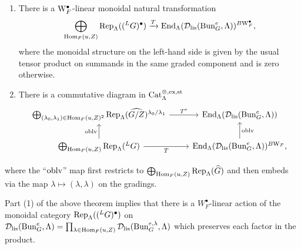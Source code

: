 \begin{thm}\label{thm:extended-hecke-action}
\begin{enumerate}
\item{There is a $\mathrm{W}_F^{\bullet}$-linear monoidal natural transformation 
\begin{equation*}
\bigoplus_{\mathrm{Hom}_{F}(u,Z)}\mathrm{Rep}_{\Lambda}(({^L}G)^{\bullet}) \xrightarrow{T} \mathrm{End}_{\Lambda}(\mathcal{D}_{\textnormal{lis}}(\mathrm{Bun}_{G}^{e},\Lambda))^{B\mathrm{W}_F^{\bullet}},
\end{equation*}
where the monoidal structure on the left-hand side is given by the usual tensor product on summands in the same graded component and is zero otherwise.
}
\item{There is a commutative diagram in $\mathrm{Cat}^{\otimes,\mathrm{ex}, \mathrm{st}}_{\Lambda}$  
\[\begin{tikzcd}
	{ \bigoplus_{(\lambda_{0}, \lambda_{1}) \in \Hom_{F}(u, Z)^{2}} \tn{Rep}_{\Lambda}(\widehat{G/Z})^{\lambda_{0}/\lambda_{1}} } & {\End_{\Lambda}(\mc{D}_{\tn{lis}}(\Bun_{G}^{e},\Lambda)) } \\
	{\bigoplus_{\Hom_{F}(u,Z)}\Rep_{\Lambda}({^L}G)} & {\End_{\Lambda}(\mc{D}_{\tn{lis}}(\Bun_{G}^{e},\Lambda))^{B\Weil_{F}},}
	\arrow["{T^e}", from=1-1, to=1-2]
	\arrow["\oblv", from=2-1, to=1-1]
	\arrow["T"', from=2-1, to=2-2]
	\arrow["\oblv"', from=2-2, to=1-2]
\end{tikzcd}\]}
\end{enumerate}
where the ``$\textnormal{oblv}$'' map first restricts to $\bigoplus_{\mathrm{Hom}_{F}(u,Z)}\mathrm{Rep}_{\Lambda}(\widehat{G})$ and then embeds via the map $\lambda \mapsto (\lambda,\lambda)$ on the gradings.
\end{thm}

\begin{rque}
    Part (1) of the above theorem implies that there is a $W_{F}^{\bullet}$-linear action of the monoidal category $\mathrm{Rep}_{\Lambda}(({^L}G)^{\bullet})$ on $\mathcal{D}_{\textnormal{lis}}(\mathrm{Bun}_{G}^{e},\Lambda) = \prod_{\lambda \in \mathrm{Hom}_{F}(u,Z)} \mathcal{D}_{\textnormal{lis}}(\mathrm{Bun}_{G}^{e,\lambda},\Lambda)$ which preserves each factor in the product.
\end{rque}

